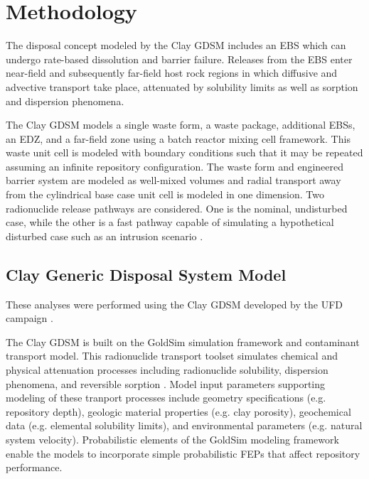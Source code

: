 \section{Methodology}

The disposal concept modeled by the Clay \gls{GDSM} includes an \gls{EBS} which 
can undergo rate-based dissolution and barrier failure. Releases from the 
\gls{EBS} enter 
near-field and subsequently far-field host rock regions in which diffusive and 
advective transport take place, attenuated by solubility limits as well as 
sorption and dispersion phenomena.  

The Clay \gls{GDSM} models a single waste form, a waste package, additional 
\glspl{EBS}, 
an \gls{EDZ}, and a far-field zone using a batch reactor mixing cell framework. 
This waste unit cell is modeled 
with boundary conditions such that it may be repeated assuming an infinite 
repository configuration. The waste form and engineered barrier system are 
modeled as well-mixed volumes 
and radial transport away from the cylindrical base case unit cell is modeled in 
one dimension. Two radionuclide release pathways are considered. One is the 
nominal, undisturbed case, while the other is a fast pathway capable of 
simulating a hypothetical disturbed case such as an intrusion scenario 
\cite{clayton_generic_2011}.

\subsection{Clay Generic Disposal System Model}

These analyses were performed using the Clay \gls{GDSM} developed by the 
\gls{UFD} campaign \cite{clayton_generic_2011}. 

The Clay \gls{GDSM} is built on the GoldSim simulation framework and contaminant 
transport model.  This radionuclide transport toolset simulates chemical and 
physical attenuation processes including radionuclide solubility, dispersion 
phenomena, and reversible sorption \cite{golder_goldsim_2010, 
golder_goldsim_ct_2010}. Model input parameters supporting modeling of these tranport 
processes include geometry specifications (e.g. repository depth), geologic 
material properties (e.g. clay porosity), geochemical data 
(e.g. elemental solubility limits), and environmental parameters (e.g. natural 
system velocity). Probabilistic elements of the GoldSim modeling 
framework enable the models to incorporate simple probabilistic \gls{FEPs} that 
affect repository performance.

